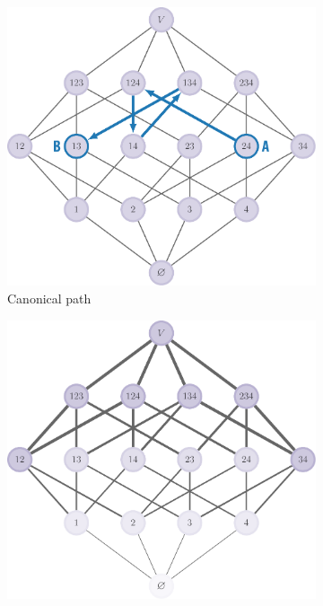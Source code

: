 \renewcommand{\subflen}{0.48\textwidth}
\begin{figure}[tbp]
  \begin{subfigure}[b]{\subflen}
    \centering
    \includegraphics[width=\textwidth]{figures/gibbs/cp_easy_path_4.pdf}
    \caption{Canonical path}
    \label{fig:cong1}
  \end{subfigure}\hspace{1em}
  \begin{subfigure}[b]{\subflen}
    \centering
    \includegraphics[width=\textwidth]{figures/gibbs/cp_easy.pdf}

\end{subfigure}
\end{figure}
